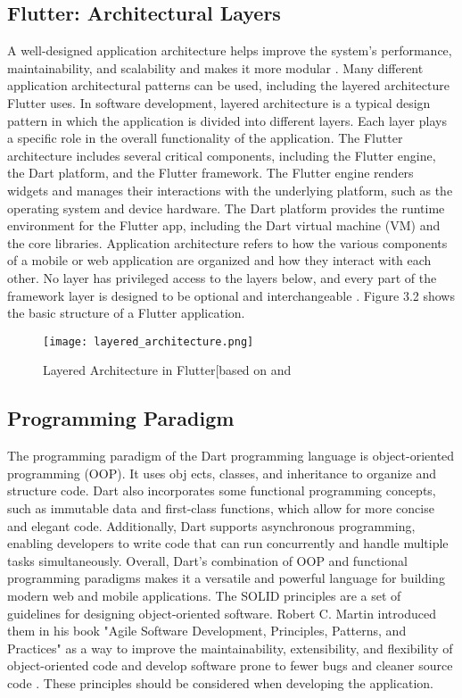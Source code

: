 \subsection{Flutter: Architectural Layers}
A well-designed application architecture helps improve the system's performance, maintainability, and scalability and makes it more modular \cite{.softwarearchi}. Many different application architectural patterns can be used, including the layered architecture Flutter uses. In software development, layered architecture is a typical design pattern in which the application is divided into different layers. Each layer plays a specific role in the overall functionality of the application. The Flutter architecture includes several critical components, including the Flutter engine, the Dart platform, and the Flutter framework. The Flutter engine renders widgets and manages their interactions with the underlying platform, such as the operating system and device hardware. The Dart platform provides the runtime environment for the Flutter app, including the Dart virtual machine (VM) and the core libraries. Application architecture refers to how the various components of a mobile or web application are organized and how they interact with each other. No layer has privileged access to the layers below, and every part of the framework layer is designed to be optional and interchangeable \cite{.flutterarchitecture}. Figure 3.2 shows the basic structure of a Flutter application. 
\begin{figure}[H]
	\centering
	\texttt{[image: layered\_architecture.png]}
	\caption[Layered Architecture in Flutter]{Layered Architecture in Flutter[based on \cite{.flutterarchitecture} and \cite[p. 50]{.flutterinaction}}
\end{figure}

\subsection{Programming Paradigm}
The programming paradigm of the Dart programming language is object-oriented programming (OOP). It uses obj ects, classes, and inheritance to organize and structure code. Dart also incorporates some functional programming concepts, such as immutable data and first-class functions, which allow for more concise and elegant code. Additionally, Dart supports asynchronous programming, enabling developers to write code that can run concurrently and handle multiple tasks simultaneously. Overall, Dart's combination of OOP and functional programming paradigms makes it a versatile and powerful language for building modern web and mobile applications. The SOLID principles are a set of guidelines for designing object-oriented software. Robert C. Martin introduced them in his book "Agile Software Development, Principles, Patterns, and Practices" as a way to improve the maintainability, extensibility, and flexibility of object-oriented code and develop software prone to fewer bugs and cleaner source code \cite{.martin}. These principles should be considered when developing the application.

